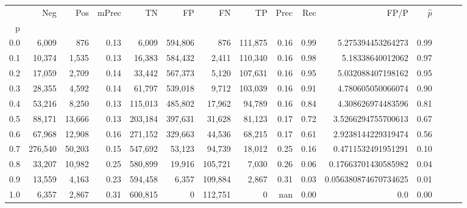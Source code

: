 \begin{tabular}{rrrrrrrrrrrrrrr}
\toprule
{} &      Neg &     Pos & mPrec &       TN &       FP &       FN &       TP &  Prec &   Rec &                  FP/P & $\hat{p}$ \\
p   &          &         &       &          &          &          &          &       &       &                       &           \\
\midrule
0.0 &    6,009 &     876 &  0.13 &    6,009 &  594,806 &      876 &  111,875 &  0.16 &  0.99 &     5.275394453264273 &      0.99 \\
0.1 &   10,374 &   1,535 &  0.13 &   16,383 &  584,432 &    2,411 &  110,340 &  0.16 &  0.98 &      5.18338640012062 &      0.97 \\
0.2 &   17,059 &   2,709 &  0.14 &   33,442 &  567,373 &    5,120 &  107,631 &  0.16 &  0.95 &     5.032088407198162 &      0.95 \\
0.3 &   28,355 &   4,592 &  0.14 &   61,797 &  539,018 &    9,712 &  103,039 &  0.16 &  0.91 &     4.780605050066074 &      0.90 \\
0.4 &   53,216 &   8,250 &  0.13 &  115,013 &  485,802 &   17,962 &   94,789 &  0.16 &  0.84 &     4.308626974483596 &      0.81 \\
0.5 &   88,171 &  13,666 &  0.13 &  203,184 &  397,631 &   31,628 &   81,123 &  0.17 &  0.72 &    3.5266294755700613 &      0.67 \\
0.6 &   67,968 &  12,908 &  0.16 &  271,152 &  329,663 &   44,536 &   68,215 &  0.17 &  0.61 &    2.9238144229319474 &      0.56 \\
0.7 &  276,540 &  50,203 &  0.15 &  547,692 &   53,123 &   94,739 &   18,012 &  0.25 &  0.16 &    0.4711532491951291 &      0.10 \\
0.8 &   33,207 &  10,982 &  0.25 &  580,899 &   19,916 &  105,721 &    7,030 &  0.26 &  0.06 &   0.17663701430585982 &      0.04 \\
0.9 &   13,559 &   4,163 &  0.23 &  594,458 &    6,357 &  109,884 &    2,867 &  0.31 &  0.03 &  0.056380874670734625 &      0.01 \\
1.0 &    6,357 &   2,867 &  0.31 &  600,815 &        0 &  112,751 &        0 &   nan &  0.00 &                   0.0 &      0.00 \\
\bottomrule
\end{tabular}
